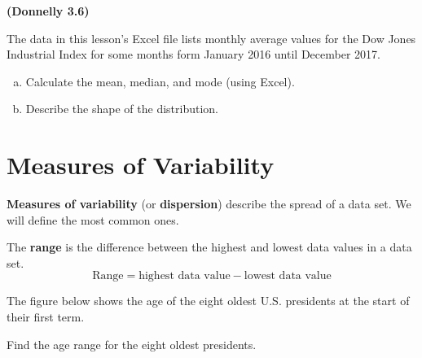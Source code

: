 \documentclass[12pt, letterpaper]{article}
\newcounter{exercise}
\theoremstyle{definition}
\begin{document}
\vfill

\newpage


\begin{exercise} \textbf{(Donnelly 3.6)}

The data in this lesson's Excel file lists monthly average values for the Dow Jones Industrial Index for some months form January 2016 until December 2017.
\begin{enumerate}[(a)]
\item Calculate the mean, median, and mode (using Excel).
\item Describe the shape of the distribution.
\end{enumerate}


\end{exercise}


\vspace{2in}


\section*{Measures of Variability}

\textbf{Measures of variability} (or \textbf{dispersion}) describe the spread of a data set.  We will define the most common ones.

\begin{defn}
The \textbf{range} is the difference between the highest and lowest data values in a data set.
$$ \text{Range}=\text{highest data value}-\text{lowest data value} $$
\end{defn}

\begin{exercise}

The figure below shows the age of the eight oldest U.S. presidents at the start of their first term.

\begin{bchart}[step=10,max=70]
\end{bchart}


Find the age range for the eight oldest presidents.
\end{exercise}

\vfill
\end{document}
